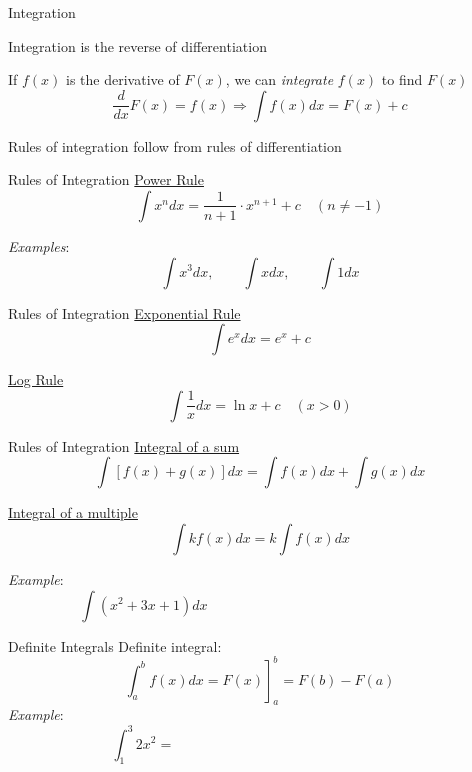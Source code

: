 \documentclass{./../../Latex/teaching_slides}
\begin{document}
\begin{frame}{Integration}
\begin{witemize}
  \item Integration is the reverse of differentiation 
  \item If $f(x)$ is the derivative of $F(x)$, we can \textit{integrate} $f(x)$ to find $F(x)$
  $$ \frac{d}{d x} F(x)=f(x) \Rightarrow \int f(x) d x=F(x)+c $$
  \item Rules of integration follow from rules of differentiation
\end{witemize}
\end{frame}

\begin{frame}{Rules of Integration}
\underline{Power Rule}
$$\int x^n d x=\frac{1}{n+1} \cdot x^{n +1} + c \quad(n \neq-1)$$

\textit{Examples}: $$ \int x^3 d x , \quad \quad \int x d x, \quad  \quad \int 1 d x $$
\end{frame}

\begin{frame}{Rules of Integration}
\underline{Exponential Rule}
$$
\int e^x d x=e^x+c
$$

\underline{Log Rule}
$$
\int \frac{1}{x} d x=\ln x+c \quad(x>0)
$$
\end{frame}

\begin{frame}{Rules of Integration}
\underline{Integral of a sum}
$$
\int[f(x)+g(x)] d x=\int f(x) d x+\int g(x) d x$$

\underline{Integral of a multiple}
$$\int k f(x) d x=k \int f(x) d x$$

\textit{Example}: $$ \int (x^2 + 3x + 1) dx \hspace{7cm} $$
\end{frame}

\begin{frame}{Definite Integrals}
Definite integral:
$$ \left.\int_a^b f(x) d x=F(x)\right]_{a}^b=F(b)-F(a) $$
\textit{Example}:  $$ \int_1^3 2 x^2 = \hspace{7cm}$$
\end{frame}
\end{document}
